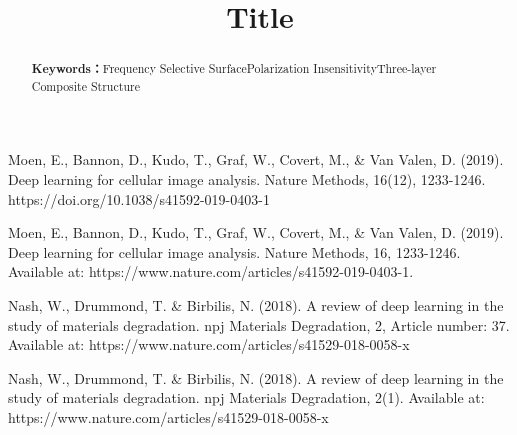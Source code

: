 \documentclass[withoutpreface,bwprint]{cumcmthesis}
\title{Title}
\begin{document}
 \maketitle
\renewcommand{\abstractname}{Abstract}
\renewcommand{\keywords}{\textbf{Keywords：}}
\begin{abstract}
\begin{spacing}{1.6}

\end{spacing}
\noindent\keywords{Frequency Selective Surface\quad Polarization Insensitivity\quad Three-layer Composite Structure}
\end{abstract}

 \newpage


 


%

\newpage
\begin{thebibliography}{99}

 Moen, E., Bannon, D., Kudo, T., Graf, W., Covert, M., \& Van Valen, D. (2019). Deep learning for cellular image analysis. Nature Methods, 16(12), 1233-1246. https://doi.org/10.1038/s41592-019-0403-1

Moen, E., Bannon, D., Kudo, T., Graf, W., Covert, M., \& Van Valen, D. (2019). Deep learning for cellular image analysis. Nature Methods, 16, 1233-1246. Available at: https://www.nature.com/articles/s41592-019-0403-1.

Nash, W., Drummond, T. \& Birbilis, N. (2018). A review of deep learning in the study of materials degradation. npj Materials Degradation, 2, Article number: 37. Available at: https://www.nature.com/articles/s41529-018-0058-x

Nash, W., Drummond, T. \& Birbilis, N. (2018). A review of deep learning in the study of materials degradation. npj Materials Degradation, 2(1). Available at: https://www.nature.com/articles/s41529-018-0058-x 

\end{thebibliography}

%
%
%

% 
\end{document}
